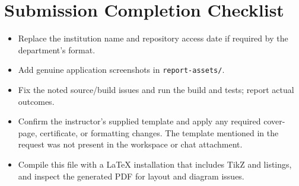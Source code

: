 \documentclass[12pt,a4paper]{report}
\begin{document}
\chapter{Submission Completion Checklist}
\begin{itemize}[leftmargin=*]
  \item Replace the institution name and repository access date if required by
        the department's format.
  \item Add genuine application screenshots in \texttt{report-assets/}.
  \item Fix the noted source/build issues and run the build and tests; report
        actual outcomes.
  \item Confirm the instructor's supplied template and apply any required
        cover-page, certificate, or formatting changes. The template mentioned
        in the request was not present in the workspace or chat attachment.
  \item Compile this file with a LaTeX installation that includes TikZ and
        listings, and inspect the generated PDF for layout and diagram issues.
\end{itemize}
\end{document}

